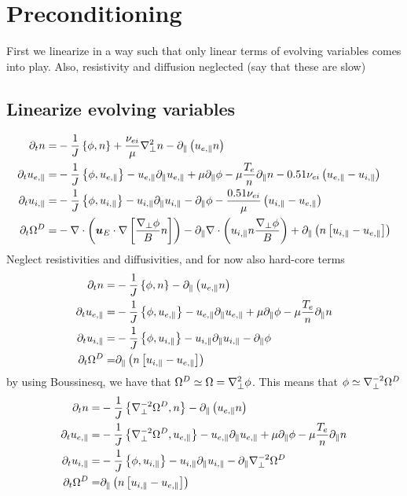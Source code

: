 \section{Preconditioning}
%
First we linearize in a way such that only linear terms of evolving variables comes into play.
Also, resistivity and diffusion neglected (say that these are slow)

\subsection{Linearize evolving variables}
%
\begin{align*}
 \partial_t n
 =&
 -\frac{1}{J}\L\{\phi,n\R\}
 +\frac{\nu_{ei}}{\mu} \grad_\perp^2 n
 -\partial_\| \L(u_{e,\|}n\R)
\\
%
%
%
\partial_t u_{e,\|}
 =&
 -\frac{1}{J}\L\{\phi,u_{e,\|}\R\}
 - u_{e,\|} \partial_\| u_{e,\|}
 + \mu \partial_\| \phi
 - \mu \frac{T_e }{n}\partial_\|   n
 - 0.51 \nu_{ei} \L(u_{e,\|}-u_{i,\|}\R)
\\
%
%
%
\partial_t u_{i,\|}
 =&
 -\frac{1}{J}\L\{\phi,u_{i,\|}\R\}
 - u_{i,\|} \partial_\| u_{i,\|}
 - \partial_\|\phi
 - \frac{ 0.51 \nu_{ei} }{ \mu } \L(u_{i,\|}-u_{e,\|}\R)
\\
%
%
%
  \partial_t \Om^D
  =&
  - \div \L( \ve{u}_E\cdot\nabla \L[\frac{\grad_\perp \phi}{B}n \R] \R)
  - \partial_\|\div \L( u_{i,\|}n \frac{\grad_\perp \phi}{B}\R)
 + \partial_\| \L(n\L[ u_{i,\|} - u_{e,\|} \R]\R)
\end{align*}
%
Neglect resistivities and diffusivities, and for now also hard-core terms
%
\begin{align*}
 \partial_t n
 =&
 -\frac{1}{J}\L\{\phi,n\R\}
 -\partial_\| \L(u_{e,\|}n\R)
\\
%
%
%
\partial_t u_{e,\|}
 =&
 -\frac{1}{J}\L\{\phi,u_{e,\|}\R\}
 - u_{e,\|} \partial_\| u_{e,\|}
 + \mu \partial_\| \phi
 - \mu \frac{T_e}{n}\partial_\|  n
\\
%
%
%
\partial_t u_{i,\|}
 =&
 -\frac{1}{J}\L\{\phi,u_{i,\|}\R\}
 - u_{i,\|} \partial_\| u_{i,\|}
 - \partial_\|\phi
\\
%
%
%
  \partial_t \Om^D
  =&
  \partial_\| \L(n\L[ u_{i,\|} - u_{e,\|} \R]\R)
\end{align*}
%
by using Boussinesq, we have that $\Omega^D\simeq\Omega=\nabla_\perp^2\phi$.
This means that $\phi\simeq\nabla_\perp^{-2}\Omega^D$
%
\begin{align*}
 \partial_t n
 =&
 -\frac{1}{J}\L\{\grad_\perp^{-2}\Om^D,n\R\}
 -\partial_\| \L(u_{e,\|}n\R)
\\
%
%
%
\partial_t u_{e,\|}
 =&
 -\frac{1}{J}\L\{\grad_\perp^{-2}\Om^D,u_{e,\|}\R\}
 - u_{e,\|} \partial_\| u_{e,\|}
 + \mu \partial_\| \phi
 - \mu \frac{T_e  }{n}\partial_\|  n
\\
%
%
%
\partial_t u_{i,\|}
 =&
 -\frac{1}{J}\L\{\phi,u_{i,\|}\R\}
 - u_{i,\|} \partial_\| u_{i,\|}
 - \partial_\|\grad_\perp^{-2}\Om^D
\\
%
%
%
  \partial_t \Om^D
  =&
  \partial_\| \L(n\L[ u_{i,\|} - u_{e,\|} \R]\R)
\end{align*}
